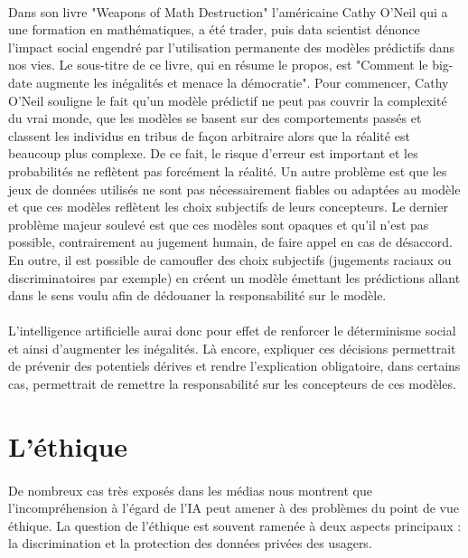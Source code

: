 \paragraph{}Dans son livre "Weapons of Math Destruction" \cite{mathDestruction} l'américaine Cathy O'Neil qui a une formation en mathématiques, a été trader, puis data scientist dénonce l'impact social engendré par l'utilisation permanente des modèles prédictifs dans nos vies. Le sous-titre de ce livre, qui en résume le propos, est "Comment le big-date augmente les inégalités et menace la démocratie". Pour commencer, Cathy O'Neil souligne le fait qu'un modèle prédictif ne peut pas couvrir la complexité du vrai monde, que les modèles se basent sur des comportements passés et classent les individus en tribus de façon arbitraire alors que la réalité est beaucoup plus complexe. De ce fait, le risque d'erreur est important et les probabilités ne reflètent pas forcément la réalité. Un autre problème est que les jeux de données utilisés ne sont pas nécessairement fiables ou adaptées au modèle et que ces modèles reflètent les choix subjectifs de leurs concepteurs. Le dernier problème majeur soulevé est que ces modèles sont opaques et qu'il n'est pas possible, contrairement au jugement humain, de faire appel en cas de désaccord. En outre, il est possible de camoufler des choix subjectifs (jugements raciaux ou discriminatoires par exemple) en créent un modèle émettant les prédictions allant dans le sens voulu afin de dédouaner la responsabilité sur le modèle.

\paragraph{}L'intelligence artificielle aurai donc pour effet de renforcer le déterminisme social et ainsi d'augmenter les inégalités. Là encore, expliquer ces décisions permettrait de prévenir des potentiels dérives et rendre l'explication obligatoire, dans certains cas, permettrait de remettre la responsabilité sur les concepteurs de ces modèles.

\section{L'éthique}
\paragraph{}De nombreux cas très exposés dans les médias nous montrent que l'incompréhension à l'égard de l'IA peut amener à des problèmes du point de vue éthique. La question de l'éthique est souvent ramenée à deux aspects principaux : la discrimination et la protection des données privées des usagers.

